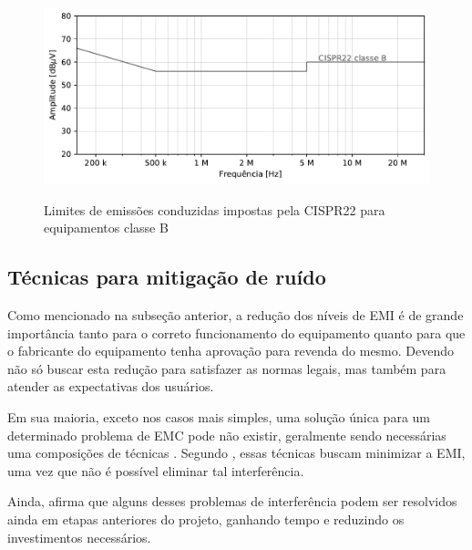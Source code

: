             \begin{figure}[H]
            	\centering
            	\caption{Limites de emissões conduzidas impostas pela CISPR22 para equipamentos classe B}
            	\includegraphics[scale=.9]{pdf/cond/norma_cond.pdf}
            	\label{fig:cispr22_cond}
            \end{figure}
            
            \subsection{Técnicas para mitigação de ruído} \label{cap:fund_emc_conv_mitig}
            
            Como mencionado na subseção anterior, a redução dos níveis de EMI é de grande importância tanto para o correto funcionamento do equipamento quanto para que o fabricante do equipamento tenha aprovação para revenda do mesmo. Devendo não só buscar esta redução para satisfazer as normas legais, mas também para atender as expectativas dos usuários. %
            
            Em sua maioria, exceto nos casos mais simples, uma solução única para um determinado problema de EMC pode não existir, geralmente sendo necessárias uma composições de técnicas \cite{ref:EMC_livro_NoiseReduct}. Segundo , essas técnicas buscam minimizar a EMI, uma vez que não é possível eliminar tal interferência.
            
            Ainda,  afirma que alguns desses problemas de interferência podem ser resolvidos ainda em etapas anteriores do projeto, ganhando tempo e reduzindo os investimentos necessários. 
            
